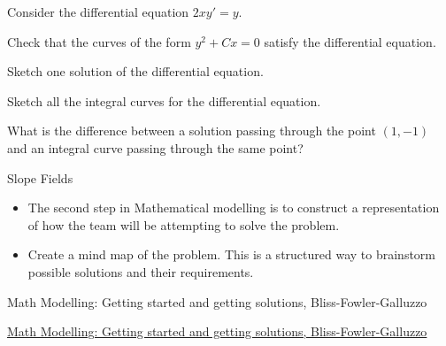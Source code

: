 \bookonlynewpage

\question Consider the differential equation $2xy'=y$.
	
	\begin{parts}
		\item Check that the curves of the form $y^2 + C x = 0$ satisfy the differential equation.
		\item Sketch one solution of the differential equation.
		\item Sketch all the integral curves for the differential equation.
		\item What is the difference between a solution passing through the point $(1,-1)$ and an integral curve passing through the same point?
	\end{parts}











%
%



\begin{module}{Slope Fields}
	\label{intro-slopefields}

	
	
\end{module}



\begin{lesson}

	\begin{itemize}
		\item The second step in Mathematical modelling is to construct a representation of how the team will be attempting to solve the problem.
		\item Create a mind map of the problem. This is a structured way to brainstorm possible solutions and their requirements.
	\end{itemize}
	

\begin{annotation}
	\begin{goals}
	Math Modelling: Getting started and getting solutions, Bliss-Fowler-Galluzzo
	
	\hfill {}	
	\end{goals}
\end{annotation}
	 \href{https://m3challenge.siam.org/resources/modeling-handbook}{Math Modelling: Getting started and getting solutions, Bliss-Fowler-Galluzzo}

\end{lesson}




